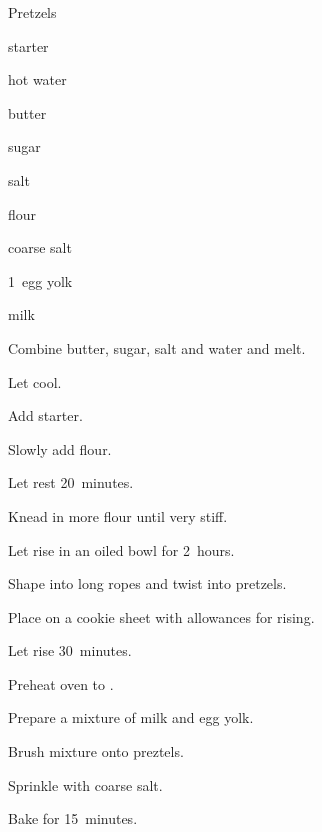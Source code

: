 \begin{recipe}{Pretzels}{}{}

\begin{ingredients}
\item {} starter
\item \C{\half} hot water
\item {} butter
\item \Tp{1\half} sugar
\item {} salt
\item {} flour
\item coarse salt
\item 1~egg yolk
\item {} milk
\end{ingredients}

\begin{directions}
\item Combine butter, sugar, salt and water and melt.
\item Let cool.
\item Add starter.
\item Slowly add  flour.
\item Let rest 20~minutes.
\item Knead in more flour until very stiff.
\item Let rise in an oiled bowl for 2~hours.
\item Shape into long ropes and twist into pretzels.
\item Place on a cookie sheet with allowances for rising.
\item Let rise 30~minutes.
\item Preheat oven to .
\item Prepare a mixture of milk and egg yolk.
\item Brush mixture onto preztels.
\item Sprinkle with coarse salt.
\item Bake for 15~minutes.
\end{directions}
\end{recipe}
